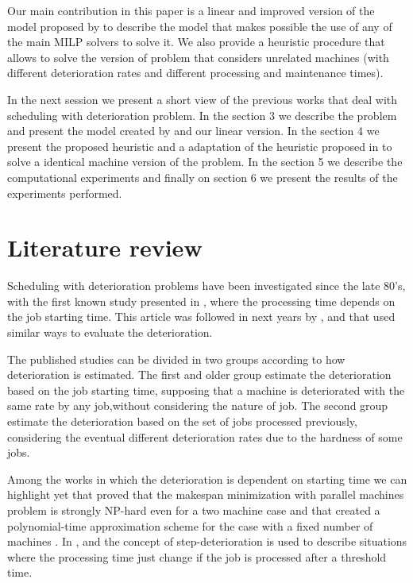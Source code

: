 \documentclass[a4paper,11pt]{article}
\begin{document}
 Our main contribution in this paper is a linear and improved version of the model proposed by \citep{ruiz2017makespan} to describe the model that makes possible the use of any of the main MILP solvers to solve it. We also provide a heuristic procedure that allows to solve the version of problem that considers unrelated machines (with different deterioration rates and different processing and maintenance times).
 
 In the next session we present a short view of the previous works that deal with scheduling with deterioration problem. In the section 3 we describe the problem and present the model created by \citep{ruiz2017makespan} and our linear version. In the section 4 we present the proposed heuristic and a adaptation of the heuristic proposed in \citep{ruiz2017makespan} to solve a identical machine version of the problem. In the section 5 we describe the computational experiments and finally on section 6 we present the results of the experiments performed.  
 
\section{Literature review}

 Scheduling with deterioration problems have been investigated since the late 80's, with the first known study presented in \citep{gupta1988single}, where the processing time depends on the job starting time. This article was followed in next years by \citep{browne1990scheduling}, \citep{mosheiov1991v} and \citep{mosheiov1994scheduling} that used similar ways to evaluate the deterioration. 
 
 The published studies can be divided in two groups according to how deterioration is estimated. The first and older group estimate the deterioration based on the job starting time, supposing that a machine is deteriorated with the same rate by any job,without considering the nature of job. The second group estimate the deterioration based on the set of jobs processed previously, considering the eventual different deterioration rates due to the hardness of some jobs.  
 
 Among the works in which the deterioration is dependent on starting time we can highlight yet \citep{Mosheiov1998} that proved that the makespan minimization with parallel machines problem is strongly NP-hard even for a two machine case and \citep{JI2008342} that created a polynomial-time approximation scheme for the case with a fixed number of machines . In \citep{cheng2001single}, \citep{leung2008minimizing} and \citep{lalla2016modeling} the concept of step-deterioration is used to describe situations where the processing time just change if the job is processed after a threshold time. 
 
\end{document}
